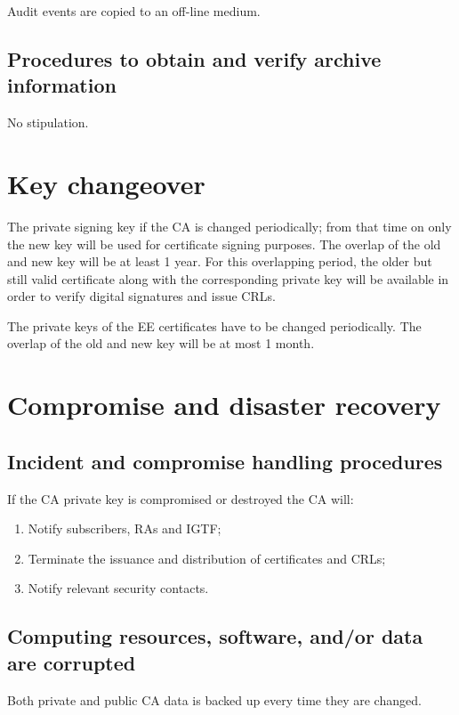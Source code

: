 Audit events are copied to an off-line medium.

\subsection{Procedures to obtain and verify archive information}

No stipulation.

\section{Key changeover}

The private signing key if the CA is changed periodically; from that time on only the new key will be used for certificate signing purposes. The overlap of the old and new key will be at least 1 year. For this overlapping period, the older but still valid certificate along with the corresponding private key will be available in order to verify digital signatures and issue CRLs.

The private keys of the EE certificates have to be changed periodically. The overlap of the old and new key will be at most 1 month.

\section{Compromise and disaster recovery}
\subsection{Incident and compromise handling procedures}

If the CA private key is compromised or destroyed the CA will:

\begin{enumerate}
\item{Notify subscribers, RAs and IGTF;}
\item{Terminate the issuance and distribution of certificates and CRLs;}
\item{Notify relevant security contacts.}
\end{enumerate}

\subsection{Computing resources, software, and/or data are corrupted}

Both private and public CA data is backed up every time they are changed.

